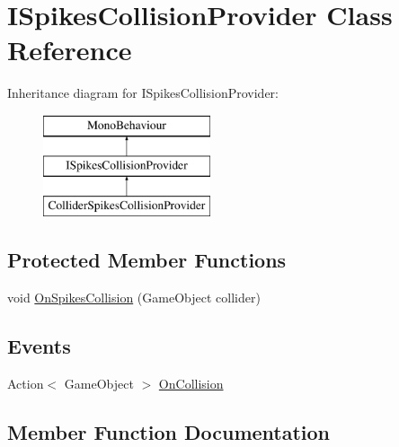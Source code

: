\hypertarget{class_i_spikes_collision_provider}{}\section{I\+Spikes\+Collision\+Provider Class Reference}
\label{class_i_spikes_collision_provider}
Inheritance diagram for I\+Spikes\+Collision\+Provider\+:\begin{figure}[H]
\begin{center}
\leavevmode
\includegraphics[height=3.000000cm]{class_i_spikes_collision_provider}
\end{center}
\end{figure}
\subsection*{Protected Member Functions}
\begin{DoxyCompactItemize}
\item 
void \mbox{\hyperlink{class_i_spikes_collision_provider_ad106be80fd4a5c48471ce06aaa22f159}{On\+Spikes\+Collision}} (Game\+Object collider)
\end{DoxyCompactItemize}
\subsection*{Events}
\begin{DoxyCompactItemize}
\item 
Action$<$ Game\+Object $>$ \mbox{\hyperlink{class_i_spikes_collision_provider_aad19affffed13b2c644b405596412ae6}{On\+Collision}}
\end{DoxyCompactItemize}


\subsection{Member Function Documentation}
\mbox{\label{class_i_spikes_collision_provider_ad106be80fd4a5c48471ce06aaa22f159}} 
